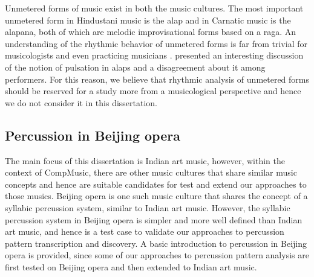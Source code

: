 Unmetered forms of music exist in both the music cultures. The most important unmetered form in Hindustani music is the \gls{alap} and in Carnatic music is the \gls{alapana}, both of which are melodic improvisational forms based on a \gls{raga}. An understanding of the rhythmic behavior of unmetered forms is far from trivial for musicologists and even practicing musicians \cite{clayton:96:freerhythm}.  presented an interesting discussion of the notion of pulsation in \glspl{alap} and a disagreement about it among performers. For this reason, we believe that rhythmic analysis of unmetered forms should be reserved for a study more from a musicological perspective and hence we do not consider it in this dissertation. 
%
%
%
\subsection{Percussion in Beijing opera}\label{sec:bkgnd:bopercussion}
The main focus of this dissertation is Indian art music, however, within the context of CompMusic, there are other music cultures that share similar music concepts and hence are suitable candidates for test and extend our approaches to those musics. Beijing opera is one such music culture that shares the concept of a syllabic percussion system, similar to Indian art music. However, the syllabic percussion system in Beijing opera is simpler and more well defined than Indian art music, and hence is a test case to validate our approaches to percussion pattern transcription and discovery. A basic introduction to percussion in Beijing opera is provided, since some of our approaches to percussion pattern analysis are first tested on Beijing opera and then extended to Indian art music. 


